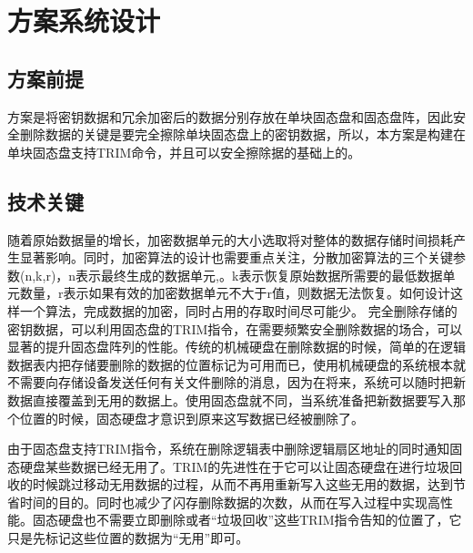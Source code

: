 \chapter{方案系统设计}
\section{方案前提}
方案是将密钥数据和冗余加密后的数据分别存放在单块固态盘和固态盘阵，因此安全删除数据的关键是要完全擦除单块固态盘上的密钥数据，所以，本方案是构建在单块固态盘支持TRIM命令，并且可以安全擦除据的基础上的。
\section{技术关键}
随着原始数据量的增长，加密数据单元的大小选取将对整体的数据存储时间损耗产生显著影响。同时，加密算法的设计也需要重点关注，分散加密算法的三个关键参数(n,k,r)，n表示最终生成的数据单元,。k表示恢复原始数据所需要的最低数据单元数量，r表示如果有效的加密数据单元不大于r值，则数据无法恢复。如何设计这样一个算法，完成数据的加密，同时占用的存取时间尽可能少。 
完全删除存储的密钥数据，可以利用固态盘的TRIM指令，在需要频繁安全删除数据的场合，可以显著的提升固态盘阵列的性能。传统的机械硬盘在删除数据的时候，简单的在逻辑数据表内把存储要删除的数据的位置标记为可用而已，使用机械硬盘的系统根本就不需要向存储设备发送任何有关文件删除的消息，因为在将来，系统可以随时把新数据直接覆盖到无用的数据上。使用固态盘就不同，当系统准备把新数据要写入那个位置的时候，固态硬盘才意识到原来这写数据已经被删除了。


由于固态盘支持TRIM指令，系统在删除逻辑表中删除逻辑扇区地址的同时通知固态硬盘某些数据已经无用了。TRIM的先进性在于它可以让固态硬盘在进行垃圾回收的时候跳过移动无用数据的过程，从而不再用重新写入这些无用的数据，达到节省时间的目的。同时也减少了闪存删除数据的次数，从而在写入过程中实现高性能。固态硬盘也不需要立即删除或者“垃圾回收”这些TRIM指令告知的位置了，它只是先标记这些位置的数据为“无用”即可。


